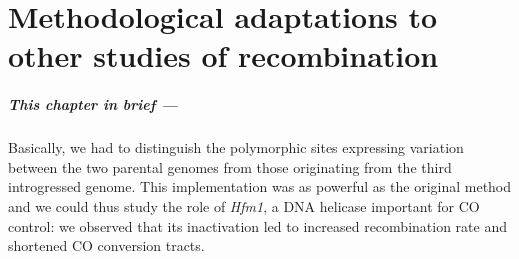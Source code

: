 \chapter{\label{ch:8-HFM1}Methodological adaptations to other studies of recombination}



\minitoc{}

{\small{} \itshape{}

\paragraph{This chapter in brief —}

Basically, we had to distinguish the polymorphic sites expressing variation between the two parental genomes from those originating from the third introgressed genome.
This implementation was as powerful as the original method and we could thus study the role of \textit{Hfm1}, a DNA helicase important for CO control: we observed that its inactivation led to increased recombination rate and shortened CO conversion tracts.

}

